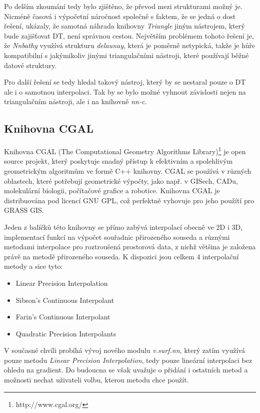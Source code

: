 \documentclass[12pt,a4paper]{article}
\begin{document}
Po delším zkoumání tedy bylo zjištěno, že převod mezi strukturami možný je. Nicméně časová i výpočetní náročnost společně s faktem, že se jedná o dost  řešení, ukázaly, že samotná náhrada knihovny \emph{Triangle} jiným nástrojem, který bude zajišťovat DT, není správnou cestou. Největším problémem tohoto řešení je, že \emph{Nnbathy} využívá strukturu \emph{delaunay}, která je poměrně netypická, takže je hůře kompatibilní s jakýmikoliv jinými triangulačními nástroji, které používají běžné datové struktury.

Pro další řešení se tedy hledal takový nástroj, který by se nestaral pouze o DT ale i o samotnou interpolaci. Tak by se bylo možné vyhnout závislosti nejen na triangulačním nástroji, ale i na knihovně \emph{nn-c}.

\newpage
\subsection{Knihovna CGAL}
Knihovna CGAL (The Computational Geometry Algorithms Library)\footnote{http://www.cgal.org/} je open source projekt, který poskytuje snadný přístup k efektivním a spolehlivým geometrickým algoritmům ve formě C++ knihovny. CGAL se používá v různých oblastech, které potřebují geometrické výpočty, jako např. v GISech, CADu, molekulární biologii, počítačové grafice a robotice. Knihovna CGAL je distribuována pod licencí GNU GPL, což perfektně vyhovuje pro jeho použítí pro GRASS GIS.

Jeden z balíčků této knihovny se přímo zabývá interpolací obecně ve 2D i 3D, implementací funkcí na výpočet souřadnic přirozeného souseda a různými metodami interpolace pro roztroušená prostorová data, z nichž většina je založena právě na metodě přirozeného souseda. K dispozici jsou celkem 4 interpolační metody a sice tyto:
\begin{itemize}
\item Linear Precision Interpolation
\item Sibson's Continuous Interpolant
\item Farin's Continuous Interpolant
\item Quadratic Precision Interpolants
\end{itemize}

V současné chvíli probíhá vývoj nového modulu \emph{v.surf.nn}, který zatím využívá pouze metodu \emph{Linear Precision Interpolation}, tedy pouze lineární interpolaci bez ohledu na gradient. Do budoucna se však uvažuje o přidání i ostatních metod a možnosti nechat uživateli volbu, kterou metodu chce použít. 
\end{document}
